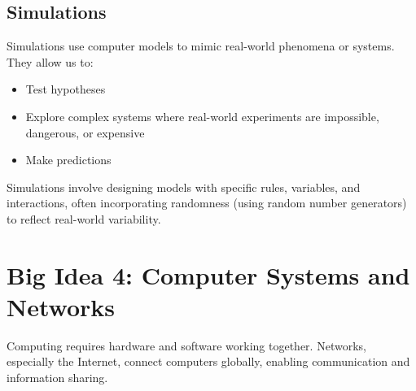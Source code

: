 \documentclass[11pt,oneside]{book}
\begin{document}
\section{Simulations}
\label{sec:simulations}
Simulations use computer models to mimic real-world phenomena or systems. They allow us to:
\begin{itemize}
    \item Test hypotheses
    \item Explore complex systems where real-world experiments are impossible, dangerous, or expensive
    \item Make predictions
\end{itemize}
Simulations involve designing models with specific rules, variables, and interactions, often incorporating randomness (using random number generators) to reflect real-world variability.

\chapter{Big Idea 4: Computer Systems and Networks}
\label{chap:systems_networks}
Computing requires hardware and software working together. Networks, especially the Internet, connect computers globally, enabling communication and information sharing.

\end{document}
